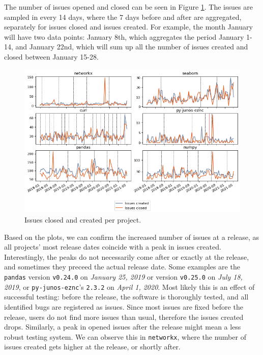 The number of issues opened and closed can be seen in Figure \ref{fig:issues_created_closed}. The issues are sampled in every 14 days, where the 7 days before and after are aggregated, separately for issues closed and issues created. For example, the month January will have two data points: January 8th, which aggregates the period January 1-14, and January 22nd, which will sum up all the number of issues created and closed between January 15-28.

\begin{figure}
    \centering
    \includegraphics[width=\textwidth]{figures/qualitative/issues_closed_created/issues.png}
    \caption{Issues closed and created per project.}
    \label{fig:issues_created_closed}
\end{figure}

Based on the plots, we can confirm the increased number of issues at a release, as all projects' most release dates coincide with a peak in issues created. Interestingly, the peaks do not necessarily come after or exactly at the release, and sometimes they preceed the actual release date. Some examples are the \texttt{pandas} version \texttt{v0.24.0} on \textit{January 25, 2019} or version \texttt{v0.25.0} on \textit{July 18, 2019}, or \texttt{py-junos-eznc}'s \texttt{2.3.2} on \textit{April 1, 2020}. Most likely this is an effect of successful testing: before the release, the software is thoroughly tested, and all identified bugs are registered as issues. Since most issues are fixed before the release, users do not find more issues than usual, therefore the issues created drops. Similarly, a peak in opened issues after the release might mean a less robust testing system. We can observe this in \texttt{networkx}, where the number of issues created gets higher at the release, or shortly after.

